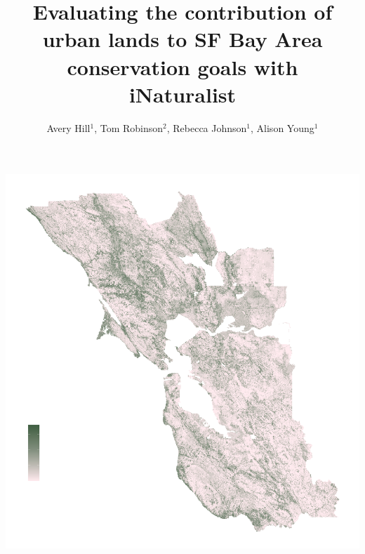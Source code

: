 \documentclass[a0paper,fleqn]{betterposter}
\begin{document}
{{\begin{minipage}[c]{0.65\textwidth}
    \includegraphics[width=\textwidth]{img/species_richness.png}
  \end{minipage}

}{

\vspace{-4in}
\hspace{0in}

}

}{

\title{Evaluating the contribution of urban lands to SF Bay Area conservation goals with \\iNaturalist}
\author{Avery Hill$^1$, Tom Robinson$^2$, Rebecca Johnson$^1$, Alison Young$^1$}

}
\end{document}
